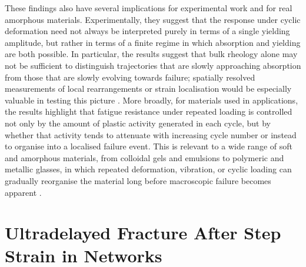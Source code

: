 \documentclass[asymmetricmargins]{library/duthesis}%
\begin{document}
These findings also have several implications for experimental work and for real amorphous materials. Experimentally, they suggest that the response under cyclic deformation need not always be interpreted purely in terms of a single yielding amplitude, but rather in terms of a finite regime in which absorption and yielding are both possible. In particular, the results suggest that bulk rheology alone may not be sufficient to distinguish trajectories that are slowly approaching absorption from those that are slowly evolving towards failure; spatially resolved measurements of local rearrangements or strain localisation would be especially valuable in testing this picture \cite{divoux_stress_2011,divouxTransientShearBanding2010,divoux_yielding_2012,grenard_timescales_2014,gibaud_heterogeneous_2010}. More broadly, for materials used in applications, the results highlight that fatigue resistance under repeated loading is controlled not only by the amount of plastic activity generated in each cycle, but by whether that activity tends to attenuate with increasing cycle number or instead to organise into a localised failure event. This is relevant to a wide range of soft and amorphous materials, from colloidal gels and emulsions to polymeric and metallic glasses, in which repeated deformation, vibration, or cyclic loading can gradually reorganise the material long before macroscopic failure becomes apparent \cite{bonn_yield_2017,SCHUH2007,hufnagel_deformation_2016,greer_shear_2013}.

\section*{Ultradelayed Fracture After Step Strain in Networks}
\end{document}
